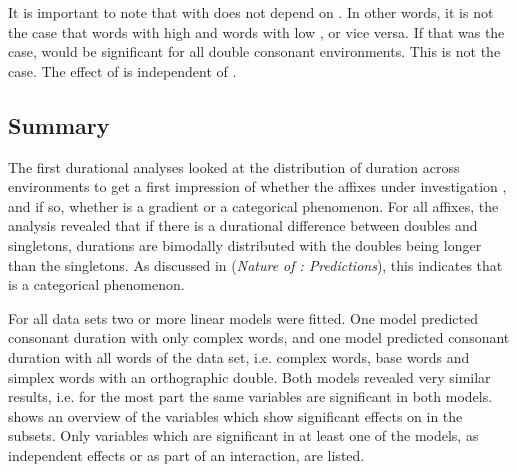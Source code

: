 It is important to note that  with  does not depend on . In other words, it is not the case that words with high   and words with low  , or vice versa. If that was the case,  would be significant for all double consonant environments. This is not the case. The effect of  is independent of . 


\subsection{Summary} \label{discussion experiment}

The first durational analyses looked at the distribution of duration across environments to get a first impression of whether the affixes under investigation , and if so, whether  is a gradient or a categorical phenomenon. 
For all affixes,  the analysis revealed that if there is a durational difference between doubles and singletons, durations are bimodally distributed with the doubles being longer than the singletons. As discussed in  (\textit{Nature of : Predictions}), this indicates that  is a categorical phenomenon.

For all data sets two or more linear models were fitted. One model predicted consonant duration with only complex words, and one model predicted consonant duration with all words of the data set, i.e. complex words, base words and simplex words with an orthographic double. 
Both models revealed very similar results, i.e. for the most part the same variables are significant in both models.
 shows an overview of the variables which show significant effects on  in the subsets. Only variables which are significant in at least one of the models, as independent effects or as part of an interaction, are listed. 



